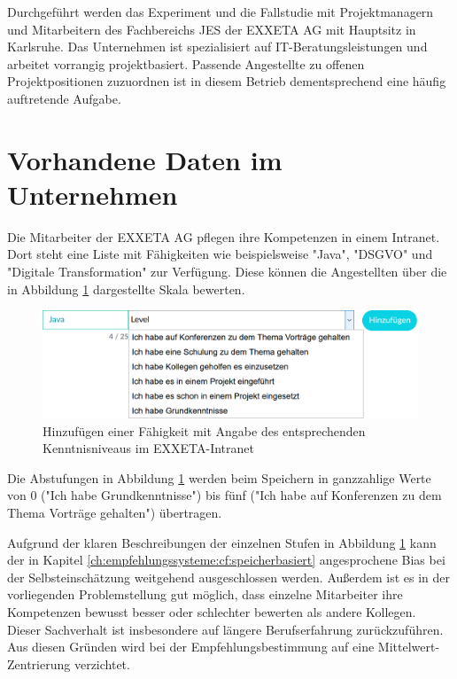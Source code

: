 Durchgeführt werden das Experiment und die Fallstudie mit Projektmanagern und Mitarbeitern des Fachbereichs \ac{JES} der EXXETA AG mit Hauptsitz in Karlsruhe. Das Unternehmen ist spezialisiert auf IT-Beratungsleistungen und arbeitet vorrangig projektbasiert. Passende Angestellte zu offenen Projektpositionen zuzuordnen ist in diesem Betrieb dementsprechend eine häufig auftretende Aufgabe.

\section{Vorhandene Daten im Unternehmen}
\label{ch:methodik:versuchsaufbau}
Die Mitarbeiter der EXXETA AG pflegen ihre Kompetenzen in einem Intranet. Dort steht eine Liste mit \anzFaehigkeiten Fähigkeiten wie beispielsweise "Java", "DSGVO" und "Digitale Transformation" zur Verfügung. Diese können die Angestellten über die in Abbildung \ref{fig:methodik:versuchsaufbau:daten:abb1} dargestellte Skala bewerten.

\begin{figure}[h]
	\centering
	\includegraphics[width=1\textwidth]{gfx/skill-level.png}
	\caption{Hinzufügen einer Fähigkeit mit Angabe des entsprechenden Kenntnisniveaus im EXXETA-Intranet}
	\label{fig:methodik:versuchsaufbau:daten:abb1}
\end{figure}

Die Abstufungen in Abbildung \ref{fig:methodik:versuchsaufbau:daten:abb1} werden beim Speichern in ganzzahlige Werte von 0 ("Ich habe Grundkenntnisse") bis fünf ("Ich habe auf Konferenzen zu dem Thema Vorträge gehalten") übertragen.

Aufgrund der klaren Beschreibungen der einzelnen Stufen in Abbildung \ref{fig:methodik:versuchsaufbau:daten:abb1} kann der in Kapitel \ref{ch:empfehlungssysteme:cf:speicherbasiert} angesprochene Bias bei der Selbsteinschätzung weitgehend ausgeschlossen werden. Außerdem ist es in der vorliegenden Problemstellung gut möglich, dass einzelne Mitarbeiter ihre Kompetenzen bewusst besser oder schlechter bewerten als andere Kollegen. Dieser Sachverhalt ist insbesondere auf längere Berufserfahrung zurückzuführen. Aus diesen Gründen wird bei der Empfehlungsbestimmung auf eine Mittelwert-Zentrierung verzichtet.

